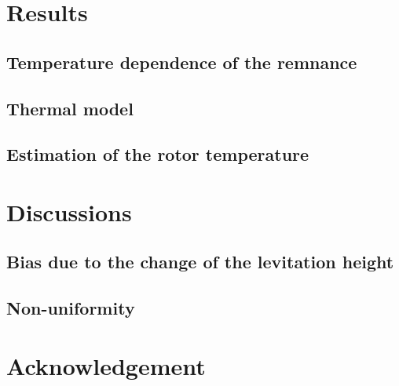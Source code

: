 \documentclass[12pt]{amsart}
\begin{document}
\section{Results}
\subsection{Temperature dependence of the remnance}

\subsection{Thermal model}

\subsection{Estimation of the rotor temperature}

\section{Discussions}
\subsection{Bias due to the change of the levitation height}

\subsection{Non-uniformity}

\section*{Acknowledgement}
\end{document}
